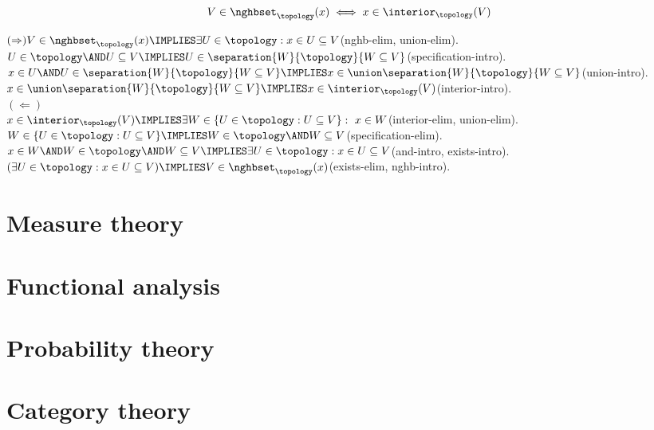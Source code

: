 \newcommand*{\blipo}{\separation{W}{\topology}{W\subseteq V}}
\begin{theorem}
\[
V\in\nghbset_\topology(x) \iff x\in \interior_\topology(V)
\]
\end{theorem}
\Proof
$(\Rightarrow)\\
V\in \nghbset_\topology(x) \IMPLIES \exists U\in \topology: x\in U \subseteq V$\hfill(nghb-elim, union-elim).
\\
$U\in\topology\AND U\subseteq V \IMPLIES U \in \blipo $\hfill(specification-intro).
\\
$x\in U \AND U \in \blipo \IMPLIES x\in \union \blipo$\hfill(union-intro).
\\
$x\in \union \blipo \IMPLIES x\in \interior_\topology(V)$\hfill(interior-intro).
\\
$(\Leftarrow)$
\\
$x\in \interior_\topology(V) \IMPLIES \exists W\in  \{U\in\topology :U\subseteq V\}:\ x\in W$\hfill(interior-elim, union-elim).
\\
$W\in  \{U\in\topology:U\subseteq V\} \IMPLIES W\in\topology\AND W\subseteq V$\hfill(specification-elim).
\\
$x\in W\AND W\in\topology\AND W\subseteq V \IMPLIES \exists U\in \topology: x\in U \subseteq V$\hfill(and-intro, exists-intro).
\\
$(\exists U\in \topology: x\in U \subseteq V) \IMPLIES V\in \nghbset_\topology(x)$\hfill(exists-elim, nghb-intro).
\\
\Done
\section{Measure theory}
\section{Functional analysis}
\section{Probability theory}
\section{Category theory}

